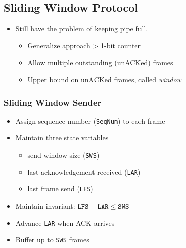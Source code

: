 \subsection{Sliding Window Protocol}
\begin{itemize}[nosep]
    \item Still have the problem of keeping pipe full.
          \begin{itemize}[nosep]
              \item Generalize approach > 1-bit counter
              \item Allow multiple outstanding (unACKed) frames
              \item Upper bound on unACKed frames, called \emph{window}
          \end{itemize}
\end{itemize}

\subsubsection{Sliding Window Sender}
\begin{itemize}
    \item Assign sequence number (\texttt{SeqNum}) to each frame
    \item Maintain three state variables
          \begin{itemize}[nosep]
              \item send window size (\texttt{SWS})
              \item last acknowledgement received (\texttt{LAR})
              \item last frame send (\texttt{LFS})
          \end{itemize}
    \item Maintain invariant: $\texttt{LFS} - \texttt{LAR} \leq \texttt{SWS}$
    \item Advance \texttt{LAR} when ACK arrives
    \item Buffer up to \texttt{SWS} frames
\end{itemize}

